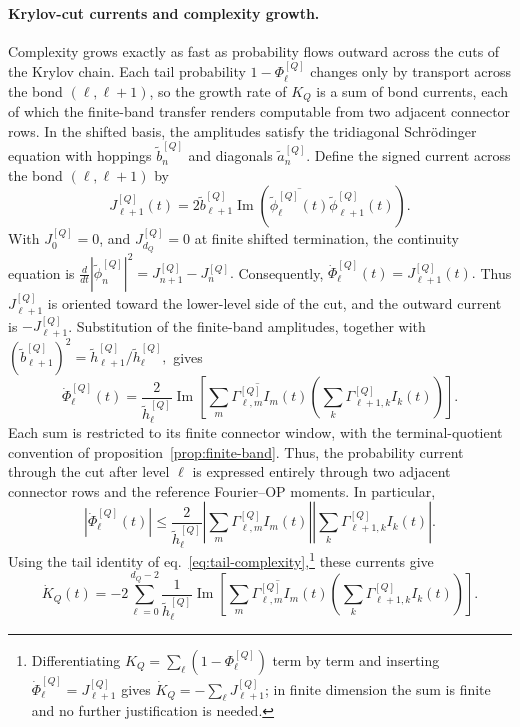\documentclass[a4paper,11pt]{article}
\def\dd{d}%
\theoremstyle{definition}
\theoremstyle{remark}
\newcommand{\dd}{\mathrm d}
\newcommand{\im}{\operatorname{Im}}
\newcommand{\tphi}{\widetilde\phi}
\newcommand{\thh}{\widetilde h}
\begin{document}
\paragraph{Krylov-cut currents and complexity growth.}
Complexity grows exactly as fast as probability flows outward across the cuts of the Krylov
chain. Each tail probability $1-\Phi_\ell^{[Q]}$ changes only by transport across the bond
$(\ell,\ell+1)$, so the growth rate of $K_Q$ is a sum of bond currents, each of which the
finite-band transfer renders computable from two adjacent connector rows. In the shifted basis, the amplitudes satisfy the tridiagonal Schr\"odinger equation with hoppings $\widetilde b_n^{[Q]}$ and diagonals $\widetilde a_n^{[Q]}$. Define the signed current across the bond $(\ell,\ell+1)$ by
\begin{equation}
   J_{\ell+1}^{[Q]}(t)
   =
   2\widetilde b_{\ell+1}^{[Q]}
   \im\!\left(
      \overline{\tphi_\ell^{[Q]}(t)}
      \tphi_{\ell+1}^{[Q]}(t)
   \right).
   \label{eq:shifted-current-main}
\end{equation}
With $J_0^{[Q]}=0$, and $J_{d_Q}^{[Q]}=0$ at finite shifted termination, the continuity equation is
$
   \frac{\dd}{\dd t}|\tphi_n^{[Q]}|^2
   =
   J_{n+1}^{[Q]}-J_n^{[Q]}.
$
Consequently,
$
   \dot\Phi_\ell^{[Q]}(t)=J_{\ell+1}^{[Q]}(t).
$
Thus $J_{\ell+1}^{[Q]}$ is oriented toward the lower-level side of the cut, and the outward
current is $-J_{\ell+1}^{[Q]}$.
Substitution of the finite-band amplitudes, together with
$
   (\widetilde b_{\ell+1}^{[Q]})^2
   =
   \thh_{\ell+1}^{[Q]}/\thh_\ell^{[Q]},
$
gives
\begin{equation}
   \dot\Phi_\ell^{[Q]}(t)
   =
   \frac{2}{\thh_\ell^{[Q]}}
   \im\!\left[
      \overline{
      \sum_m\Gamma_{\ell,m}^{[Q]}I_m(t)}
      \left(
      \sum_k\Gamma_{\ell+1,k}^{[Q]}I_k(t)
      \right)
   \right].
   \label{eq:Phi-speed-transfer-main}
\end{equation}
Each sum is restricted to its finite connector window, with the terminal-quotient convention of proposition~\ref{prop:finite-band}. Thus, the probability current through the cut after level $\ell$ is expressed entirely through two adjacent connector rows and the reference Fourier--OP moments. In particular,
\begin{equation}
   \left|\dot\Phi_\ell^{[Q]}(t)\right|
   \le
   \frac{2}{\thh_\ell^{[Q]}}
   \left|
      \sum_m\Gamma_{\ell,m}^{[Q]}I_m(t)
   \right|
   \left|
      \sum_k\Gamma_{\ell+1,k}^{[Q]}I_k(t)
   \right|.
   \label{eq:Phi-speed-bound-main}
\end{equation}
Using the tail identity of eq.~\eqref{eq:tail-complexity},\footnote{Differentiating $K_Q=\sum_{\ell}(1-\Phi_\ell^{[Q]})$ term by term and inserting $\dot\Phi_\ell^{[Q]}=J_{\ell+1}^{[Q]}$ gives $\dot K_Q=-\sum_\ell J_{\ell+1}^{[Q]}$; in finite dimension the sum is finite and no further justification is needed.} these currents give
\begin{equation}
   \dot K_Q(t)
   =
   -2\sum_{\ell=0}^{d_Q-2}
   \frac{1}{\thh_\ell^{[Q]}}
   \im\!\left[
      \overline{
      \sum_m\Gamma_{\ell,m}^{[Q]}I_m(t)}
      \left(
      \sum_k\Gamma_{\ell+1,k}^{[Q]}I_k(t)
      \right)
   \right].
   \label{eq:K-speed-transfer-main}
\end{equation}
\end{document}
